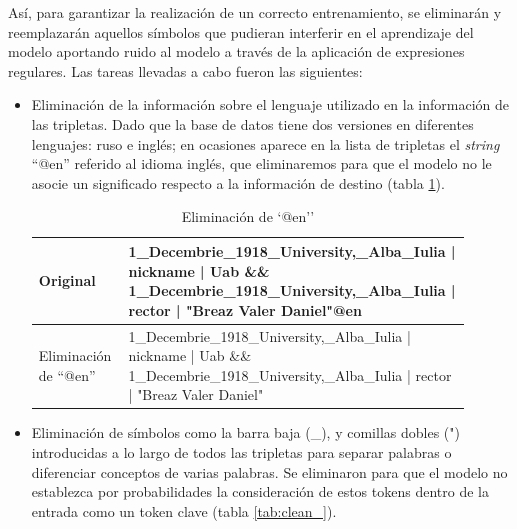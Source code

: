Así, para garantizar la realización de un correcto entrenamiento, se eliminarán y reemplazarán aquellos símbolos que pudieran interferir en el aprendizaje del modelo aportando ruido al modelo a través de la aplicación de expresiones regulares. Las tareas llevadas a cabo fueron las siguientes:

\begin{itemize}
    \item Eliminación de la información sobre el lenguaje utilizado en la información de las tripletas. Dado que la base de datos tiene dos versiones en diferentes lenguajes: ruso e inglés; en ocasiones aparece en la lista de tripletas el \textit{string} ``@en'' referido al idioma inglés, que eliminaremos para que el modelo no le asocie un significado respecto a la información de destino (tabla \ref{tab:clean_@en}).
    
    \begin{table}[h!]
    \begin{center}
    \begin{tabular}{p{0.2\linewidth} | p{0.7\linewidth}}
    Original & 1\_Decembrie\_1918\_University,\_Alba\_Iulia | nickname | Uab \&\& 1\_Decembrie\_1918\_University,\_Alba\_Iulia | rector | "Breaz Valer Daniel"\textcolor{codepurple}{@en}\\ \hline
    Eliminación de ``@en'' & 1\_Decembrie\_1918\_University,\_Alba\_Iulia | nickname | Uab \&\& 1\_Decembrie\_1918\_University,\_Alba\_Iulia | rector | "Breaz Valer Daniel"  \\
    \end{tabular}
    \caption{Eliminación de `@en''}
    \label{tab:clean_@en}
    \end{center}
    \end{table}
    
    \item Eliminación de símbolos como la barra baja (\_), y comillas dobles (") introducidas a lo largo de todos las tripletas para separar palabras o diferenciar conceptos de varias palabras. Se eliminaron para que el modelo no establezca por probabilidades la consideración de estos tokens dentro de la entrada como un token clave (tabla \ref{tab:clean_}).
    

\end{itemize}
